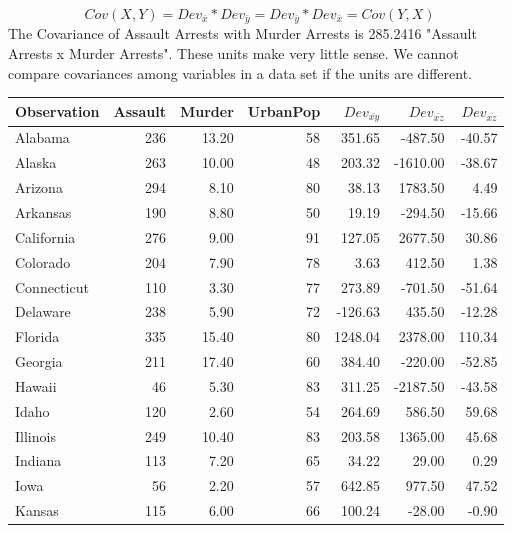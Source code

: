 \documentclass[nohyper,justified]{tufte-handout}\usepackage[]{graphicx}\usepackage[]{color}
\newcommand{\dev}[1] {Dev_{\bar{#1}}}
\begin{document}
\begin{equation*}
Cov(X,Y)=Dev_{\bar{x}}*Dev_{\bar{y}}=Dev_{\bar{y}}*Dev_{\bar{x}}=Cov(Y,X)
\end{equation*}
The Covariance of Assault Arrests with Murder Arrests is 285.2416 "Assault Arrests x Murder Arrests". These units make very little sense. We cannot compare covariances among variables in a data set if the units are different.


\begin{table}[ht]
\centering
\begin{tabular}{lrrrrrr}
  \toprule
Observation & Assault & Murder & UrbanPop & $\dev{xy}$ & ${\dev{xz}}$ & ${\dev{xz}}$ \\ 
  \midrule
Alabama & 236 & 13.20 &  58 & 351.65 & -487.50 & -40.57 \\ 
   \rowcolor[gray]{0.95}Alaska & 263 & 10.00 &  48 & 203.32 & -1610.00 & -38.67 \\ 
  Arizona & 294 & 8.10 &  80 & 38.13 & 1783.50 & 4.49 \\ 
   \rowcolor[gray]{0.95}Arkansas & 190 & 8.80 &  50 & 19.19 & -294.50 & -15.66 \\ 
  California & 276 & 9.00 &  91 & 127.05 & 2677.50 & 30.86 \\ 
   \rowcolor[gray]{0.95}Colorado & 204 & 7.90 &  78 & 3.63 & 412.50 & 1.38 \\ 
  Connecticut & 110 & 3.30 &  77 & 273.89 & -701.50 & -51.64 \\ 
   \rowcolor[gray]{0.95}Delaware & 238 & 5.90 &  72 & -126.63 & 435.50 & -12.28 \\ 
  Florida & 335 & 15.40 &  80 & 1248.04 & 2378.00 & 110.34 \\ 
   \rowcolor[gray]{0.95}Georgia & 211 & 17.40 &  60 & 384.40 & -220.00 & -52.85 \\ 
  Hawaii &  46 & 5.30 &  83 & 311.25 & -2187.50 & -43.58 \\ 
   \rowcolor[gray]{0.95}Idaho & 120 & 2.60 &  54 & 264.69 & 586.50 & 59.68 \\ 
  Illinois & 249 & 10.40 &  83 & 203.58 & 1365.00 & 45.68 \\ 
   \rowcolor[gray]{0.95}Indiana & 113 & 7.20 &  65 & 34.22 & 29.00 & 0.29 \\ 
  Iowa &  56 & 2.20 &  57 & 642.85 & 977.50 & 47.52 \\ 
   \rowcolor[gray]{0.95}Kansas & 115 & 6.00 &  66 & 100.24 & -28.00 & -0.90 \\ 

\end{tabular}
\end{table}
\end{document}
